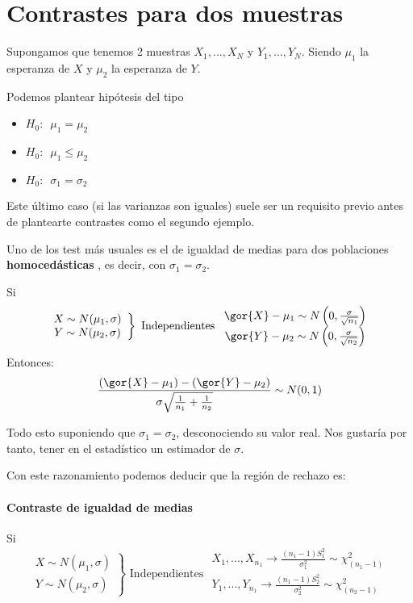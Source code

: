 \documentclass{apuntes}
\begin{document}
\pagebreak[3]
\section{Contrastes para dos muestras}

Supongamos que tenemos 2 muestras $X_1,...,X_N$ y $Y_1,...,Y_N$. Siendo $\mu_1$ la esperanza de $X$ y $\mu_2$ la esperanza de $Y$.

Podemos plantear hipótesis del tipo
\begin{itemize}
\item $H_0: \,\,\, \mu_1=\mu_2$
\item $H_0: \,\,\, \mu_1\leq\mu_2$
\item $H_0: \,\,\, \sigma_1 = \sigma_2$
\end{itemize}
Este último caso (si las varianzas son iguales) suele ser un requisito previo antes de plantearte contrastes como el segundo ejemplo.

Uno de los test más usuales es el de igualdad de medias para dos poblaciones \textbf{homocedásticas} , es decir, con $\sigma_1=\sigma_2$.

Si \[\left.\begin{array}{cc}
X\sim N(\mu_1,\sigma)\\
Y\sim N(\mu_2,\sigma)
\end{array}\right\}\text{ Independientes } \begin{array}{cc}
\gor{X} -\mu_1 \sim N\left(0,\frac{\sigma}{\sqrt{n_1}}\right)\\
\gor{Y} - \mu_2 \sim N\left(0,\frac{\sigma}{\sqrt{n_2}}\right)
\end{array}\]
Entonces:
\[\frac{(\gor{X}-\mu_1) - (\gor{Y} - \mu_2)}{\sigma\sqrt{\frac{1}{n_1} + \frac{1}{n_2}}}\sim N(0,1)\]

Todo esto suponiendo que $\sigma_1=\sigma_2$, desconociendo su valor real. Nos gustaría por tanto, tener en el estadístico un estimador de $\sigma$.

\pagebreak
Con este razonamiento podemos deducir que la región de rechazo es:


\paragraph{Contraste de igualdad de medias}
Si \[\left.\begin{array}{cc}
X\sim N(\mu_1,\sigma)\\
Y\sim N(\mu_2,\sigma)
\end{array}\right\}\text{ Independientes } \begin{array}{c}
X_1,...,X_{n_1}\to \frac{(n_1-1)S_1^2}{\sigma_1^2} \sim \chi^2_{(n_1-1)}\\
Y_1,...,Y_{n_1}\to \frac{(n_1-1)S_2^2}{\sigma_2^2} \sim \chi^2_{(n_2-1)}\\
\end{array}\]
\end{document}
